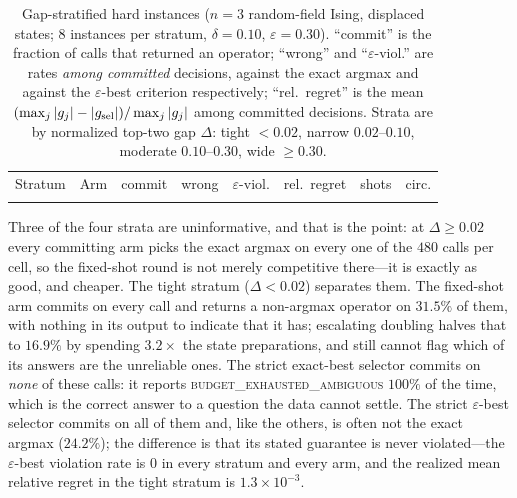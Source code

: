 \documentclass[aps,pra,reprint,superscriptaddress,nofootinbib,floatfix]{revtex4-2}
\begin{document}
\begin{table}[t]
\caption{Gap-stratified hard instances ($n=3$ random-field Ising, displaced states; $8$ instances per stratum, $\delta=0.10$, $\varepsilon=0.30$). ``commit'' is the fraction of calls that returned an operator; ``wrong'' and ``$\varepsilon$-viol.'' are rates \emph{among committed} decisions, against the exact argmax and against the $\varepsilon$-best criterion respectively; ``rel.\ regret'' is the mean $(\max_j|g_j|-|g_{\rm sel}|)/\max_j|g_j|$ among committed decisions. Strata are by normalized top-two gap $\Delta$: tight $<0.02$, narrow $0.02$--$0.10$, moderate $0.10$--$0.30$, wide $\ge0.30$.}
\label{tab:hard}
\centering
\footnotesize
\begin{ruledtabular}
\begin{tabular}{llrrrrrr}
Stratum & Arm & commit & wrong & $\varepsilon$-viol. & rel.\ regret & shots & circ.\\
\colrule

\end{tabular}
\end{ruledtabular}
\end{table}

Three of the four strata are uninformative, and that is the point: at $\Delta\ge0.02$ every committing arm picks the exact argmax on every one of the $480$ calls per cell, so the fixed-shot round is not merely competitive there---it is exactly as good, and cheaper. The tight stratum ($\Delta<0.02$) separates them. The fixed-shot arm commits on every call and returns a non-argmax operator on $31.5\%$ of them, with nothing in its output to indicate that it has; escalating doubling halves that to $16.9\%$ by spending $3.2\times$ the state preparations, and still cannot flag which of its answers are the unreliable ones. The strict exact-best selector commits on \emph{none} of these calls: it reports \textsc{budget\_exhausted\_ambiguous} $100\%$ of the time, which is the correct answer to a question the data cannot settle. The strict $\varepsilon$-best selector commits on all of them and, like the others, is often not the exact argmax ($24.2\%$); the difference is that its stated guarantee is never violated---the $\varepsilon$-best violation rate is $0$ in every stratum and every arm, and the realized mean relative regret in the tight stratum is $1.3\times10^{-3}$.
\end{document}
